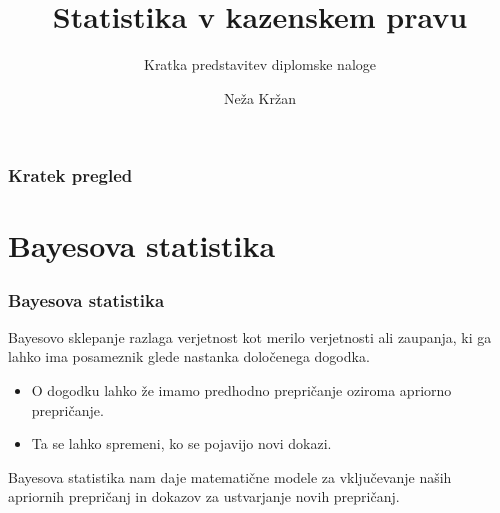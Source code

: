 \documentclass{beamer}
\begin{document}
\title{Statistika v kazenskem pravu}
\subtitle{Kratka predstavitev diplomske naloge}
\author[Neža Kržan]{Neža Kržan}
 
\date[28. november 2022] {}

\subject{Talks}

\begin{frame}
   \titlepage
\end{frame}

\begin{frame}
   \frametitle{Kratek pregled}
   \tableofcontents[pausesections]
\end{frame}

\section{Bayesova statistika}

\begin{frame}
  \frametitle{Bayesova statistika}
  Bayesovo sklepanje razlaga verjetnost kot merilo verjetnosti ali zaupanja, ki ga lahko ima posameznik glede nastanka določenega dogodka.
  \begin{itemize}
    \item O dogodku lahko že imamo predhodno prepričanje oziroma apriorno prepričanje.
    \item Ta se lahko spremeni, ko se pojavijo novi dokazi.
  \end{itemize} \vspace{3mm}
  Bayesova statistika nam daje matematične modele za vključevanje naših apriornih prepričanj in dokazov za ustvarjanje novih prepričanj.
\end{frame}
\end{document}
